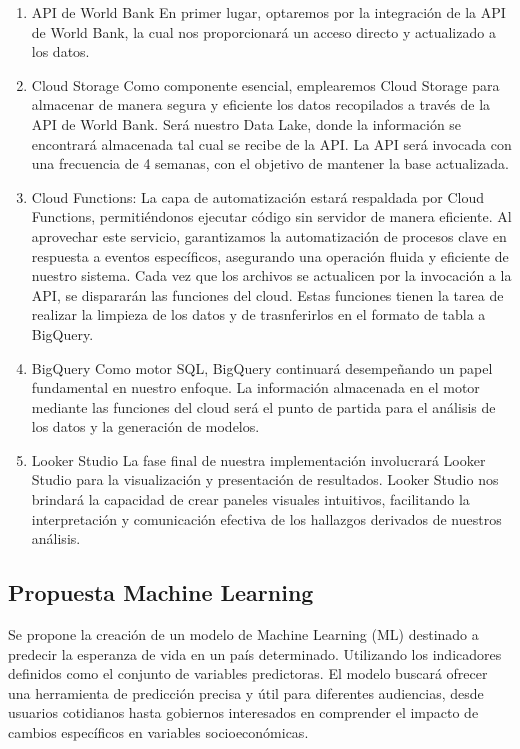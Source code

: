 \documentclass{other/docTemplate}
\begin{document}
\begin{enumerate}
  \item API de World Bank En primer lugar, optaremos por la integración de la API de World Bank, la cual nos proporcionará un acceso directo y actualizado a los datos. 
  \item Cloud Storage Como componente esencial, emplearemos Cloud Storage para almacenar de manera segura y eficiente los datos recopilados a través de la API de World Bank. Será nuestro Data Lake, donde la información se encontrará almacenada tal cual se recibe de la API. La API será invocada con una frecuencia de 4 semanas, con el objetivo de mantener la base actualizada. 
  \item Cloud Functions: La capa de automatización estará respaldada por Cloud Functions, permitiéndonos ejecutar código sin servidor de manera eficiente. Al aprovechar este servicio, garantizamos la automatización de procesos clave en respuesta a eventos específicos, asegurando una operación fluida y eficiente de nuestro sistema. Cada vez que los archivos se actualicen por la invocación a la API, se dispararán las funciones del cloud. Estas funciones tienen la tarea de realizar la limpieza de los datos y de trasnferirlos en el formato de tabla a BigQuery. 
  \item BigQuery Como motor SQL, BigQuery continuará desempeñando un papel fundamental en nuestro enfoque. La información almacenada en el motor mediante las funciones del cloud será el punto de partida para el análisis de los datos y la generación de modelos. 
  \item Looker Studio La fase final de nuestra implementación involucrará Looker Studio para la visualización y presentación de resultados. Looker Studio nos brindará la capacidad de crear paneles visuales intuitivos, facilitando la interpretación y comunicación efectiva de los hallazgos derivados de nuestros análisis.
\end{enumerate}

\subsection{Propuesta Machine Learning}

Se propone la creación de un modelo de Machine Learning (ML) destinado a predecir la esperanza de vida en un país determinado. Utilizando los indicadores definidos como el conjunto de variables predictoras.
El modelo buscará ofrecer una herramienta de predicción precisa y útil para diferentes audiencias, desde usuarios cotidianos hasta gobiernos interesados en comprender el impacto de cambios específicos en variables socioeconómicas.
\end{document}
